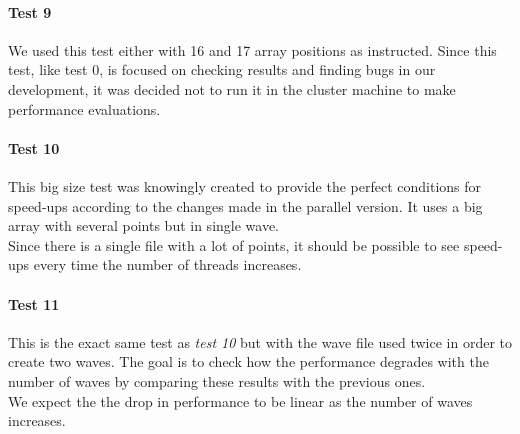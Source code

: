 \documentclass[10pt,journal,compsoc]{IEEEtran}
\begin{document}
\paragraph*{\textbf{Test 9}}
We used this test either with 16 and 17 array positions as instructed. Since this test, like test 0, is focused on checking results and finding bugs in our development, it was decided not to run it in the cluster machine to make performance evaluations.

\paragraph*{\textbf{Test 10}}
This big size test was knowingly created to provide the perfect conditions for speed-ups according to the changes made in the parallel version. It uses a big array with several points but in single wave.
\\
Since there is a single file with a lot of points, it should be possible to see speed-ups every time the number of threads increases.

\paragraph*{\textbf{Test 11}}
This is the exact same test as \textit{test 10} but with the wave file used twice in order to create two waves. The goal is to check how the performance degrades with the number of waves by comparing these results with the previous ones.
\\
We expect the the drop in performance to be linear as the number of waves increases.
\end{document}
